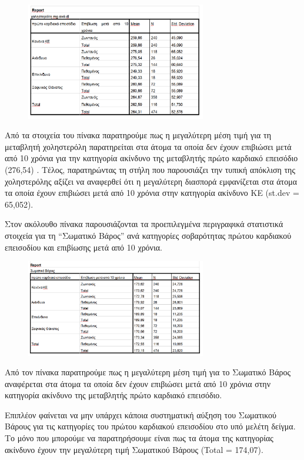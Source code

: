 \begin{figure}[hb]
        \centering
        \includegraphics[width=0.7\textwidth]{images/24.PNG}
    \end{figure}
    
Από τα στοιχεία του πίνακα παρατηρούμε πως η μεγαλύτερη μέση τιμή για τη μεταβλητή χοληστερόλη παρατηρείται στα άτομα τα οποία δεν έχουν επιβιώσει μετά από 10 χρόνια για την κατηγορία ακίνδυνο της μεταβλητής πρώτο καρδιακό επεισόδιο (276,54) . 
Τέλος,  παρατηρώντας τη στήλη που παρουσιάζει την τυπική απόκλιση της χοληστερόλης αξίζει να αναφερθεί ότι η μεγαλύτερη διασπορά εμφανίζεται στα άτομα τα οποία έχουν επιβιώσει μετά από 10 χρόνια στην κατηγορία ακίνδυνο ΚΕ (st.dev = 65,052).

\clearpage
Στον ακόλουθο πίνακα παρουσιάζονται τα προεπιλεγμένα περιγραφικά στατιστικά στοιχεία για τη “Σωματικό Βάρος” ανά κατηγορίες σοβαρότητας πρώτου καρδιακού επεισοδίου και επιβίωσης μετά από 10 χρόνια.
\begin{figure}[hb]
        \centering
        \includegraphics[width=0.7\textwidth]{images/25.PNG}
    \end{figure}
    
    Από τον πίνακα παρατηρούμε πως η μεγαλύτερη μέση τιμή για το Σωματικό Βάρος αναφέρεται στα άτομα τα οποία δεν έχουν επιβιώσει μετά από 10 χρόνια στην κατηγορία ακίνδυνο της μεταβλητής πρώτο καρδιακό επεισόδιο.
    
Επιπλέον φαίνεται να μην υπάρχει κάποια συστηματική αύξηση του Σωματικού Βάρους  για τις κατηγορίες του πρώτου καρδιακού επεισοδίου στο υπό μελέτη δείγμα. Το μόνο που μπορούμε να παρατηρήσουμε είναι πως τα άτομα της κατηγορίας ακίνδυνο έχουν την μεγαλύτερη τιμή Σωματικού Βάρους (Total = 174,07). 

